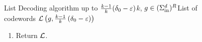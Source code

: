 \begin{figure}[!ht]
\begin{algorithm}{List Decoding algorithm up to $\frac{k-1}{k}(\delta_0-\varepsilon)$}{$k$, $g \in (\Sigma_{\mathrm{in}}^d)^R$}{List of codewords ${\mathcal L}\left(g, \frac{k-1}{k}\left(\delta_0-\varepsilon\right)\right)$}
\begin{enumerate}
\begin{itemize}
\begin{itemize}
			\item If $\Delta_R(g,h) < \frac{k-1}{k} (\delta_0-\eps)$, add $h$ to $\calL$.
		\end{itemize}
		\end{itemize}
	\item Return $\calL$.
\end{enumerate}
%
\vspace{5pt}
%
\end{algorithm}
\end{figure}

